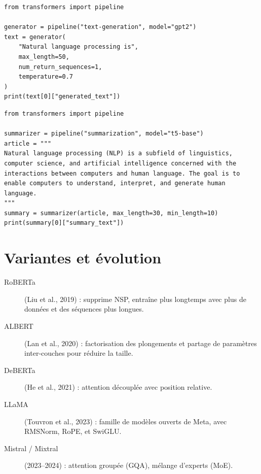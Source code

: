 \begin{codeblock}[title=\textbf{GPT-2 pour la g\'en\'eration de texte}]
\begin{verbatim}
from transformers import pipeline

generator = pipeline("text-generation", model="gpt2")
text = generator(
    "Natural language processing is",
    max_length=50,
    num_return_sequences=1,
    temperature=0.7
)
print(text[0]["generated_text"])
\end{verbatim}
\end{codeblock}

\begin{codeblock}[title=\textbf{T5 pour le r\'esum\'e}]
\begin{verbatim}
from transformers import pipeline

summarizer = pipeline("summarization", model="t5-base")
article = """
Natural language processing (NLP) is a subfield of linguistics,
computer science, and artificial intelligence concerned with the
interactions between computers and human language. The goal is to
enable computers to understand, interpret, and generate human language.
"""
summary = summarizer(article, max_length=30, min_length=10)
print(summary[0]["summary_text"])
\end{verbatim}
\end{codeblock}

\section{Variantes et \'evolution}
\label{sec:pre:variantes}

\begin{description}
    \item[RoBERTa] (Liu et al., 2019) : supprime NSP, entra\^ine plus longtemps
          avec plus de donn\'ees et des s\'equences plus longues.
    \item[ALBERT] (Lan et al., 2020) : factorisation des plongements et partage
          de param\`etres inter-couches pour r\'eduire la taille.
    \item[DeBERTa] (He et al., 2021) : attention d\'ecoupl\'ee avec position
          relative.
    \item[LLaMA] (Touvron et al., 2023) : famille de mod\`eles ouverts de
          Meta, avec RMSNorm, RoPE, et SwiGLU.
    \item[Mistral / Mixtral] (2023--2024) : attention group\'ee (GQA),
          m\'elange d'experts (MoE).
\end{description}


